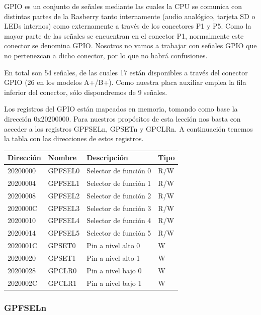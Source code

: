 GPIO es un conjunto de señales mediante las cuales la CPU se comunica con distintas partes
de la Rasberry tanto internamente (audio analógico, tarjeta SD o LEDs internos) como
externamente a través de los conectores P1 y P5. Como la mayor parte de las señales se
encuentran en el conector P1, normalmente este conector se denomina GPIO. Nosotros
no vamos a trabajar con señales GPIO que no pertenezcan a dicho conector, por lo que no
habrá confusiones.

En total son 54 señales, de las cuales 17 están disponibles a través del conector
GPIO (26 en los modelos A+/B+). Como nuestra placa auxiliar emplea la fila inferior
del conector, sólo dispondremos de 9 señales.

Los registros del GPIO están mapeados en memoria, tomando como base la dirección 0x20200000.
Para nuestros propósitos de esta lección nos basta con acceder a los registros GPFSELn,
GPSETn y GPCLRn. A continuación tenemos la tabla con las direcciones de estos registros.

\begin{table}
\centering
\begin{tabular}{ p{1.8cm} | p{2cm} | p{5cm} | p{1cm} }
{\bf Dirección} & {\bf Nombre} & {\bf Descripción} & {\bf Tipo} \\
\hline
20200000 & GPFSEL0 & Selector de función 0 & R/W \\
20200004 & GPFSEL1 & Selector de función 1 & R/W \\
20200008 & GPFSEL2 & Selector de función 2 & R/W \\
2020000C & GPFSEL3 & Selector de función 3 & R/W \\
20200010 & GPFSEL4 & Selector de función 4 & R/W \\
20200014 & GPFSEL5 & Selector de función 5 & R/W \\
2020001C & GPSET0  & Pin a nivel alto 0 & W   \\
20200020 & GPSET1  & Pin a nivel alto 1 & W   \\
20200028 & GPCLR0  & Pin a nivel bajo 0 & W  \\
2020002C & GPCLR1  & Pin a nivel bajo 1 & W  \\
\end{tabular}
\end{table}


\subsubsection{GPFSELn}

